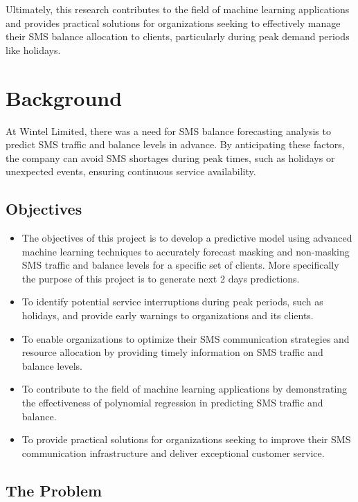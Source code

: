 \documentclass[12pt]{book} %
\begin{document}
Ultimately, this research contributes to the field of machine learning applications and provides practical solutions for organizations seeking to effectively manage their SMS balance allocation to clients, particularly during peak demand periods like holidays.






\section{Background}
At Wintel Limited, there was a need for SMS balance forecasting analysis to predict SMS traffic and balance levels in advance. By anticipating these factors, the company can avoid SMS shortages during peak times, such as holidays or unexpected events, ensuring continuous service availability.

\subsection{Objectives​}
\begin{itemize}
    \item The objectives of this project is to develop a predictive model using advanced machine learning techniques to accurately forecast masking and non-masking SMS traffic and balance levels for a specific set of clients. More specifically the purpose of this project is to generate next 2 days predictions.​
    \item To identify potential service interruptions during peak periods, such as holidays, and provide early warnings to organizations and its clients.​
    \item To enable organizations to optimize their SMS communication strategies and resource allocation by providing timely information on SMS traffic and balance levels.​
    \item To contribute to the field of machine learning applications by demonstrating the effectiveness of polynomial regression in predicting SMS traffic and balance.​
    \item To provide practical solutions for organizations seeking to improve their SMS communication infrastructure and deliver exceptional customer service.​
\end{itemize}





\subsection{The Problem}
\end{document}
